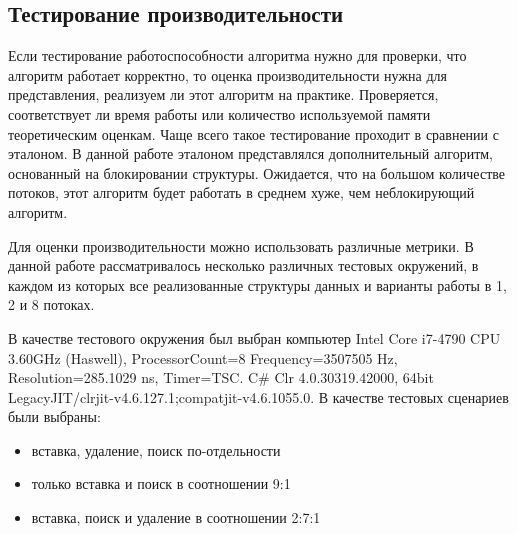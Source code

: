 \documentclass[12pt]{article}
\begin{document}
{				\subsection{Тестирование производительности}
					\par Если тестирование работоспособности алгоритма нужно для проверки, что алгоритм работает корректно, то оценка производительности нужна для представления, реализуем ли этот алгоритм на практике. Проверяется, соответствует ли время работы или количество используемой памяти теоретическим оценкам. Чаще всего такое тестирование проходит в сравнении с эталоном. В данной работе эталоном представлялся дополнительный алгоритм, основанный на блокировании структуры. Ожидается, что на большом количестве потоков, этот алгоритм будет работать в среднем хуже, чем неблокирующий алгоритм.
					\par Для оценки производительности можно использовать различные метрики. В данной работе рассматривалось несколько различных тестовых окружений, в каждом из которых все реализованные структуры данных и варианты работы в 1, 2 и 8 потоках. 
					\par В качестве тестового окружения был выбран компьютер Intel Core i7-4790 CPU 3.60GHz (Haswell), ProcessorCount=8 Frequency=3507505 Hz, Resolution=285.1029 ns, Timer=TSC. C\# Clr 4.0.30319.42000, 64bit LegacyJIT/clrjit-v4.6.127.1;compatjit-v4.6.1055.0.
					В качестве тестовых сценариев были выбраны: 
					\begin{itemize}
						\item вставка, удаление, поиск по-отдельности
						\item только вставка и поиск в соотношении 9:1
						\item вставка, поиск и удаление в соотношении 2:7:1			
					\end{itemize}
}
\end{document}
